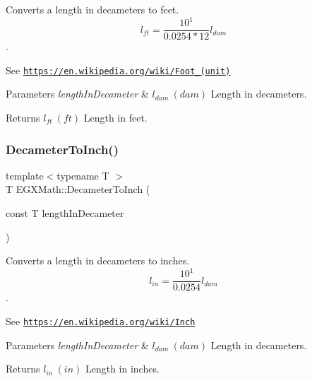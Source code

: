 Converts a length in decameters to feet. \[ l_{ft}= \frac{10^{1}}{0.0254 * 12} l_{dam} \]. 

See \href{https://en.wikipedia.org/wiki/Foot_(unit)}{\tt https\+://en.\+wikipedia.\+org/wiki/\+Foot\+\_\+(unit)} 
\begin{DoxyParams}{Parameters}
{\em length\+In\+Decameter} & $ l_{dam}\ (dam)$ Length in decameters. \\
\hline
\end{DoxyParams}
\begin{DoxyReturn}{Returns}
$ l_{ft}\ (ft)$ Length in feet. 
\end{DoxyReturn}
\mbox{\label{group___e_g_x_math-_conversions-_length_conversions-_decameter-_imperial_ga246ab50e821640008d965b5690226df5}} 
\subsubsection{\texorpdfstring{Decameter\+To\+Inch()}{DecameterToInch()}}
{\footnotesize\ttfamily template$<$typename T $>$ \\
T E\+G\+X\+Math\+::\+Decameter\+To\+Inch (\begin{DoxyParamCaption}\item[{const T}]{length\+In\+Decameter }\end{DoxyParamCaption})}



Converts a length in decameters to inches. \[ l_{in}= \frac{10^{1}}{0.0254} l_{dam} \]. 

See \href{https://en.wikipedia.org/wiki/Inch}{\tt https\+://en.\+wikipedia.\+org/wiki/\+Inch} 
\begin{DoxyParams}{Parameters}
{\em length\+In\+Decameter} & $ l_{dam}\ (dam)$ Length in decameters. \\
\hline
\end{DoxyParams}
\begin{DoxyReturn}{Returns}
$ l_{in}\ (in)$ Length in inches. 
\end{DoxyReturn}
\mbox{\label{group___e_g_x_math-_conversions-_length_conversions-_decameter-_imperial_gaee77251b6c2f2e8e0feae0032e80e0c3}} 
